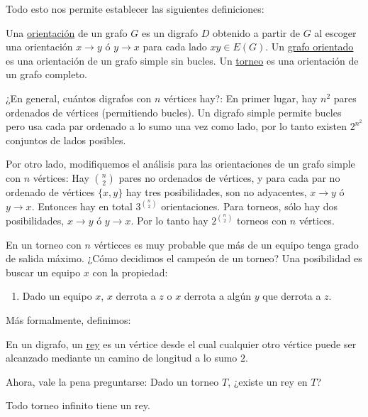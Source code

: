 Todo esto nos permite establecer las siguientes definiciones:

\begin{defn}
    Una \ul{orientación} de un grafo $G$ es un digrafo $D$ obtenido a partir de $G$ al escoger una orientación $x \rightarrow y$ ó $y \rightarrow x$ para cada lado $xy \in E(G)$. Un \ul{grafo orientado} es una orientación de un grafo simple sin bucles. Un \ul{torneo} es una orientación de un grafo completo.
\end{defn}

\begin{prob}
    ¿En general, cuántos digrafos con $n$ vértices hay?: En primer lugar, hay $n^2$ pares ordenados de vértices (permitiendo bucles). Un digrafo simple permite bucles pero usa cada par ordenado a lo sumo una vez como lado, por lo tanto existen $2^{n^2}$ conjuntos de lados posibles.
    
    Por otro lado, modifiquemos el análisis para las orientaciones de un grafo simple con $n$ vértices: Hay $\binom{n}{2}$ pares no ordenados de vértices, y para cada par no ordenado de vértices $\{x,y\}$ hay tres posibilidades, son no adyacentes, $x \rightarrow y$ ó $y \rightarrow x$. Entonces hay en total $3^{\binom{n}{2}}$ orientaciones. Para torneos, sólo hay dos posibilidades, $x \rightarrow y$ ó $y \rightarrow x$. Por lo tanto hay $2^{\binom{n}{2}}$ torneos con $n$ vértices.
\end{prob}

En un torneo con $n$ vérticces es muy probable que más de un equipo tenga grado de salida máximo. ¿Cómo decidimos el campeón de un torneo? Una posibilidad es buscar un equipo $x$ con la propiedad:

\begin{enumerate}
    \item Dado un equipo $x$, $x$ derrota a $z$ o $x$ derrota a algún $y$ que derrota a $z$.
\end{enumerate}

Más formalmente, definimos:

\begin{defn}
    En un digrafo, un \ul{rey} es un vértice desde el cual cualquier otro vértice puede ser alcanzado mediante un camino de longitud a lo sumo $2$.
\end{defn}

Ahora, vale la pena preguntarse: Dado un torneo $T$, ¿existe un rey en $T$?

\begin{teo}[Landau, 1953]
    Todo torneo infinito tiene un rey.
\end{teo}

